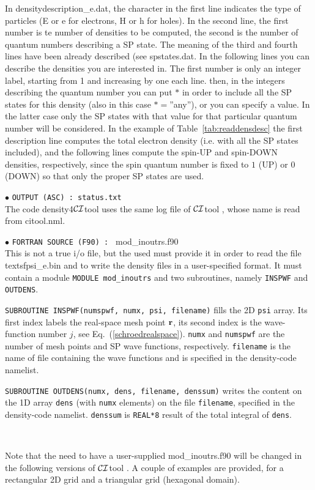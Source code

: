\documentclass[12pt,twoside]{article}
\newcommand*{\CItool}[0]{{$\cal CI$}\textsf{tool} }
\begin{document}
In \textsf{densitydescription\_e.dat}, the character in the first line
indicates the type of particles (\textsf{E} or \textsf{e} for electrons,
\textsf{H} or \textsf{h} for holes).  In the
second line, the first number is te number of densities to be computed,
the second is the number of quantum numbers describing a SP state.
The meaning of the third and fourth lines have been already described
(see \textsf{spstates.dat}.  In the following lines you can describe
the densities you are interested in.
The first number is only an integer label, starting from 1 and increasing by one each line.
then, in the integers describing the quantum number you can put $*$ in order to include
all the SP states for this density (also in this case $*=$''any''), or you can specify
a value. In the latter case only the SP states with that value for that particular
quantum number will be considered. In the example of Table~\ref{tab:readdensdesc}
the first description line computes the total electron density (i.e. with
all the SP states included), and the following lines compute the spin-UP and
spin-DOWN densities, respectively, since the spin quantum number is
fixed to $1$ (UP) or $0$ (DOWN) so that only the proper SP states are used.



$\bullet$ \verb#OUTPUT (ASC) : status.txt#
\\
The code \textsf{density4}\CItool uses the same log file of \CItool, whose
name is read from \textsf{citool.nml}.


$\bullet$ \verb#FORTRAN SOURCE (F90) : # \textsf{mod\_inoutrs.f90}
\\
This is not a true i/o file, but the used must provide it
in order to read the file textsf{psi\_e.bin} and to write the
density files in a user-specified format. It must contain a
module \texttt{MODULE mod\_inoutrs} and two subroutines, namely
\texttt{INSPWF} and \texttt{OUTDENS}.

\texttt{SUBROUTINE INSPWF(numspwf, numx, psi, filename)}
fills the 2D \texttt{psi} array. Its first index labels the
real-space mesh point ${\bf r}$, its second index is the wave-function number
$j$, see Eq.~(\ref{schroedrealspace}). \texttt{numx} and \texttt{numspwf}
are the number of mesh points and SP wave functions, respectively.
\texttt{filename} is the name of file containing the wave functions
and is specified in the density-code namelist.

\texttt{SUBROUTINE OUTDENS(numx, dens, filename, denssum)}
writes the content on the 1D array \texttt{dens} (with \texttt{numx} elements)
on the file \texttt{filename}, specified in the density-code namelist.
\texttt{denssum} is \texttt{REAL*8} result of the total integral
of \texttt{dens}.

\

Note that the need to have a user-supplied \textsf{mod\_inoutrs.f90}
will be changed in the following versions of \CItool. A couple of
examples are provided, for a rectangular 2D grid and a triangular grid (hexagonal domain).
\end{document}
